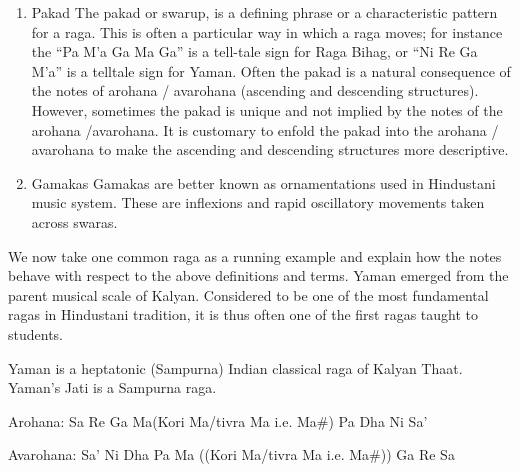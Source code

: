\begin{enumerate}
  \par
  \item Pakad
  The pakad or swarup, is a defining phrase or a characteristic pattern for a raga.  This is often a particular way in which a raga moves; for instance the ``Pa M'a Ga Ma Ga'' is a tell-tale sign for Raga Bihag, or ``Ni Re Ga M'a'' is a telltale sign for Yaman.  Often the pakad is a natural consequence of the notes of arohana / avarohana (ascending and descending structures).  However, sometimes the pakad is unique and not implied by the notes of the arohana /avarohana.  It is customary to enfold the pakad into the arohana / avarohana to make the ascending and descending structures more descriptive.
  \par
  \item Gamakas
  Gamakas are better known as ornamentations used in Hindustani music system. These are inflexions and rapid oscillatory movements taken across swaras.
\end{enumerate}
\par

We now take one common raga as a running example and explain how the notes behave with respect to the above definitions and terms. Yaman emerged from the parent musical scale of Kalyan. Considered to be one of the most fundamental ragas in Hindustani tradition, it is thus often one of the first ragas taught to students.
\par
Yaman is a heptatonic (Sampurna) Indian classical raga of Kalyan Thaat. Yaman's Jati is a Sampurna raga.
\par
Arohana: Sa Re Ga Ma(Kori Ma/tivra Ma i.e. Ma\#) Pa Dha Ni Sa'
\par
Avarohana: Sa' Ni Dha Pa Ma ((Kori Ma/tivra Ma i.e. Ma\#)) Ga Re Sa
